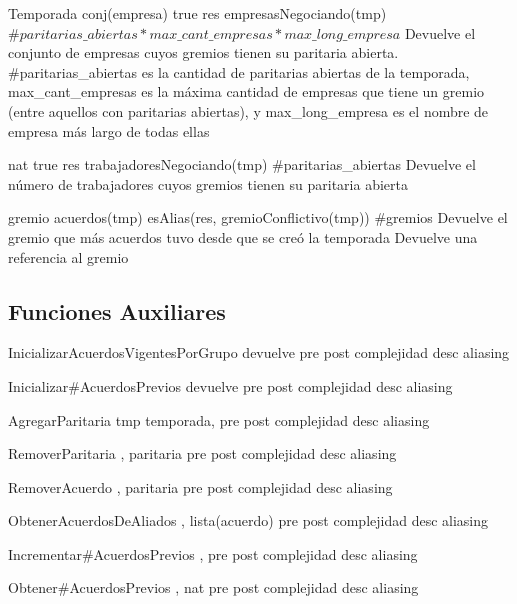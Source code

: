 \begin{interfaz}{Temporada}
{}{conj(empresa)}
{true}
{res \igobs empresasNegociando(tmp)}
{\ensuremath{\#paritarias\_abiertas * max\_cant\_empresas * max\_long\_empresa }}
{Devuelve el conjunto de empresas cuyos gremios tienen su paritaria abierta. \\

\hspace{3pt} \#paritarias\_abiertas es la cantidad de paritarias abiertas de la temporada, max\_cant\_empresas es la m\'axima cantidad de empresas que tiene un gremio (entre aquellos con paritarias abiertas), y max\_long\_empresa es el nombre de empresa m\'as largo de todas ellas}
{}

{}{nat}
{true}
{res \igobs trabajadoresNegociando(tmp)}
{\#paritarias\_abiertas}
{Devuelve el n\'umero de trabajadores cuyos gremios tienen su paritaria abierta}
{}

{}
{gremio}
{\emptyset \neq acuerdos(tmp)}
{ esAlias(res, gremioConflictivo(tmp))}
{\#gremios}
{Devuelve el gremio que m\'as acuerdos tuvo desde que se cre\'o la temporada }
{Devuelve una referencia al gremio}

\subsection{Funciones Auxiliares}

\operacion
{InicializarAcuerdosVigentesPorGrupo}
{}
{devuelve}
{pre}
{post}
{complejidad}
{desc}
{aliasing}


\operacion
{Inicializar\#AcuerdosPrevios}
{}
{devuelve}
{pre}
{post}
{complejidad}
{desc}
{aliasing}


\operacion
{AgregarParitaria}
{
{tmp}
{temporada}, }
{}
{pre}
{post}
{complejidad}
{desc}
{aliasing}


\operacion
{RemoverParitaria}
{, }
{paritaria}
{pre}
{post}
{complejidad}
{desc}
{aliasing}


\operacion
{RemoverAcuerdo}
{, }
{paritaria}
{pre}
{post}
{complejidad}
{desc}
{aliasing}


\operacion
{ObtenerAcuerdosDeAliados}
{, }
{lista(acuerdo)}
{pre}
{post}
{complejidad}
{desc}
{aliasing}

\operacion
{Incrementar\#AcuerdosPrevios}
{, }
{}
{pre}
{post}
{complejidad}
{desc}
{aliasing}

\operacion
{Obtener\#AcuerdosPrevios}
{, }
{nat}
{pre}
{post}
{complejidad}
{desc}
{aliasing}

\end{interfaz}